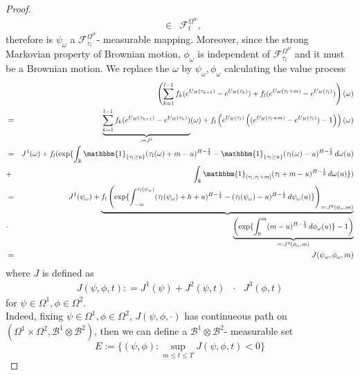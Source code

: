 \documentclass[a4paper, twoside, 11pt]{article}
\theoremstyle{definition}
\newcommand{\brkt}[1]{\left({#1} \right)}
\begin{document}
\begin{proof}
\begin{eqnarray*}
  &\in& \mathcal{F}^{\Omega^w}_t,
\end{eqnarray*}
therefore is $\psi_{\omega}$ a $\mathcal{F}^{\Omega^w}_{\tau_l}$- measurable mapping. Moreover, since the strong Markovian property of Brownian motion, $\phi_{\omega}$ is independent of $\mathcal{F}^{\Omega^w}_{\tau_l}$ and it must be a Brownian motion.  We replace the $\omega$ by $\psi_{\omega}, \phi_{\omega}$ calculating the value process
\begin{eqnarray*}
  &&\brkt{\sum_{k=1}^{l-1} f_k (e^{U_H(\tau_{k+1})}  - e^{U_H(\tau_{k})}) + f_l(e^{U_H(\tau_l+m)}-e^{U_H(\tau_l)})} (\omega)  \\
  &=& \underbrace{\sum_{k=1}^{l-1} f_k (e^{U_H(\tau_{k+1})} - e^{U_H(\tau_{k})})}_{:=J^1} (\omega) + f_l\brkt{e^{U_H(\tau_l)}\brkt{(e^{U_H(\tau_l+m)}-e^{U_H(\tau_l)})-1}}(\omega)\\
  &=& J^1(\omega) + f_l(\exp\{\int_{\mathbb{R}}\mathbbm{1}_{\{\tau_l\ge u\}}(\tau_l(\omega)+m-u)^{H-\frac{1}{2}}-\mathbbm{1}_{\{\tau_l\ge u\}}(\tau_l(\omega)-u)^{H-\frac{1}{2}}\mathop{d\omega(u)}\\
&+& \int_{\mathbb{R}} \mathbbm{1}_{(\tau_l, \tau_l+m]}(\tau_l+m - u)^{H-\frac{1}{2}}\mathop{d\omega(u)}\})\\
&=&  J^1(\psi_{\omega}) + \underbrace{f_l\brkt{\exp\{\int_{-\infty}^{\tau_l(\psi_{\omega})}(\tau_l(\psi_{\omega})+h+u)^{H-\frac{1}{2}}-(\tau_l(\psi_{\omega})-u)^{H-\frac{1}{2}}\mathop{d\psi_{\omega}(u)}\}}_{=:J^2(\psi_{\omega}, m)}}\\
&\cdot&  \underbrace{\brkt{\exp\{\int_0^{m}(m-u)^{H-\frac{1}{2}}\mathop{d \phi_{\omega}(u)}\} - 1}}_{=:J^3(\phi_{\omega}, m)}\\
  &=& J(\psi_{\omega}, \phi_{\omega}, m)
\end{eqnarray*}
where $J$ is defined as
\begin{eqnarray*}
  J(\psi, \phi, t) : = J^1(\psi) + J^2(\psi, t)  &\cdot&  J^3(\phi, t)
\end{eqnarray*}
for $\psi\in\Omega^1, \phi\in\Omega^2$.\\

Indeed, fixing $\psi\in\Omega^1, \phi\in\Omega^2$, $J(\psi, \phi, \cdot)$ has continueous path on $(\Omega^1 \times \Omega^2, \mathscr{B}^1\otimes\mathscr{B}^2)$, then we can define a $\mathscr{B}^1\otimes\mathscr{B}^2$- measurable set
$$
E := \{(\psi, \phi) : \sup\limits_{m\le t\le T} J(\psi, \phi, t) < 0\}
$$


\end{proof}
\end{document}
